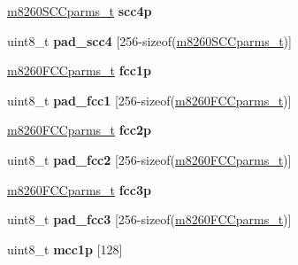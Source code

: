 \begin{DoxyCompactItemize}
\item 
\mbox{\label{structm8260___a7471c0fa2fa2bafd1f2672185839e3c2}} 
\mbox{\hyperlink{structm8260SCCparms__}{m8260\+S\+C\+Cparms\+\_\+t}} {\bfseries scc4p}
\item 
\mbox{\label{structm8260___a195cbdc40935a9c275be08194f5ee099}} 
uint8\+\_\+t {\bfseries pad\+\_\+scc4} \mbox{[}256-\/sizeof(\mbox{\hyperlink{structm8260SCCparms__}{m8260\+S\+C\+Cparms\+\_\+t}})\mbox{]}
\item 
\mbox{\label{structm8260___ae411d570edd7ed2bd0eeac3a557b7953}} 
\mbox{\hyperlink{structm8260FCCparms__}{m8260\+F\+C\+Cparms\+\_\+t}} {\bfseries fcc1p}
\item 
\mbox{\label{structm8260___aaca8886bfcea5bd1adf6c8054e5077cd}} 
uint8\+\_\+t {\bfseries pad\+\_\+fcc1} \mbox{[}256-\/sizeof(\mbox{\hyperlink{structm8260FCCparms__}{m8260\+F\+C\+Cparms\+\_\+t}})\mbox{]}
\item 
\mbox{\label{structm8260___a74b0753b6d345d2d15597bc9792ed381}} 
\mbox{\hyperlink{structm8260FCCparms__}{m8260\+F\+C\+Cparms\+\_\+t}} {\bfseries fcc2p}
\item 
\mbox{\label{structm8260___a320aa0fc5ba1590a9807f2f6d281e7c3}} 
uint8\+\_\+t {\bfseries pad\+\_\+fcc2} \mbox{[}256-\/sizeof(\mbox{\hyperlink{structm8260FCCparms__}{m8260\+F\+C\+Cparms\+\_\+t}})\mbox{]}
\item 
\mbox{\label{structm8260___a15b8c58c196539020e42f44c5dd9e56a}} 
\mbox{\hyperlink{structm8260FCCparms__}{m8260\+F\+C\+Cparms\+\_\+t}} {\bfseries fcc3p}
\item 
\mbox{\label{structm8260___ab9be12e66ef0f2bfc9ebfaa33c21e0e8}} 
uint8\+\_\+t {\bfseries pad\+\_\+fcc3} \mbox{[}256-\/sizeof(\mbox{\hyperlink{structm8260FCCparms__}{m8260\+F\+C\+Cparms\+\_\+t}})\mbox{]}
\item 
\mbox{\label{structm8260___aed0e85e2cedcdf5bb9e39cd39886be9e}} 
uint8\+\_\+t {\bfseries mcc1p} \mbox{[}128\mbox{]}
\item 
\mbox{\label{structm8260___a695d2f89bcd33b7148d9536a68bc61f3}} 

\end{DoxyCompactItemize}
